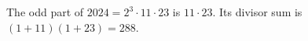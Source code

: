 The odd part of $2024=2^3\cdot11\cdot23$ is $11\cdot23$. Its divisor sum is $(1+11)(1+23)=\boxed{288}$.
